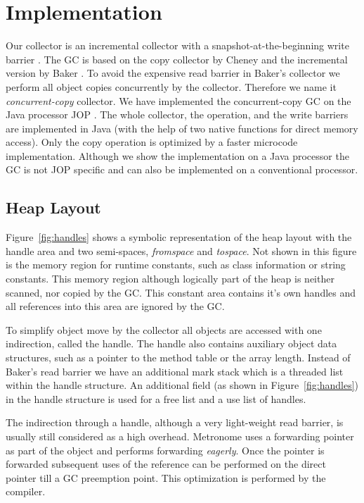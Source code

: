 \section{Implementation}

Our collector is an incremental collector with a
snapshot-at-the-beginning write barrier \cite{gc:yuasa90}. The GC is
based on the copy collector by Cheney \cite{gc:cheney70} and the
incremental version by Baker \cite{gc:baker78}. To avoid the
expensive read barrier in Baker's collector we perform all object
copies concurrently by the collector. Therefore we name it
\emph{concurrent-copy} collector. We have implemented the
concurrent-copy GC on the Java processor JOP \cite{jop:thesis,
jop:jnl:jsa2007}. The whole collector, the  operation, and
the write barriers are implemented in Java (with the help of two
native functions for direct memory access). Only the copy operation
is optimized by a faster microcode implementation. Although we show
the implementation on a Java processor the GC is not JOP specific
and can also be implemented on a conventional processor.

\subsection{Heap Layout}

Figure~\ref{fig:handles} shows a symbolic representation of the heap
layout with the handle area and two semi-spaces, \emph{fromspace} and
\emph{tospace}. Not shown in this figure is the memory region for
runtime constants, such as class information or string constants.
This memory region although logically part of the heap is neither
scanned, nor copied by the GC. This constant area contains it's own
handles and all references into this area are ignored by the GC.

To simplify object move by the collector all objects are accessed
with one indirection, called the handle. The handle also contains
auxiliary object data structures, such as a pointer to the method
table or the array length. Instead of Baker's read barrier we have
an additional mark stack which is a threaded list within the handle
structure. An additional field (as shown in
Figure~\ref{fig:handles}) in the handle structure is used for a free
list and a use list of handles.

The indirection through a handle, although a very light-weight read
barrier, is usually still considered as a high overhead. Metronome
\cite{gc:bacon03} uses a forwarding pointer as part of the object
and performs forwarding \emph{eagerly}. Once the pointer is
forwarded subsequent uses of the reference can be performed on the
direct pointer till a GC preemption point. This optimization is
performed by the compiler.

